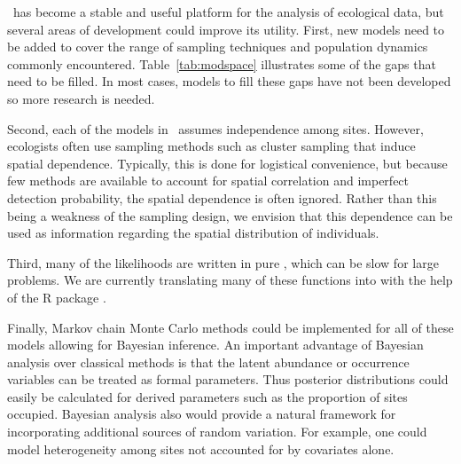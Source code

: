 \documentclass[article,shortnames]{jss}
\newcommand{\um}{\pkg{unmarked}}
\newcommand{\rlang}{\proglang{R}}
\begin{document}
{\um\ has become a stable and useful platform for the analysis of ecological
data, but several areas of development could improve its utility.  First, new
models need to be added to cover the range of sampling techniques and
population dynamics commonly encountered. Table~\ref{tab:modspace} illustrates
some of the gaps that need to be filled. In most cases, models to fill these
gaps have not been developed so more research is needed.


Second, each of the models in \um\ assumes independence among sites. However,
ecologists often use sampling methods such as cluster sampling that induce
spatial dependence. Typically, this is done for logistical convenience, but
because few methods are available to account for spatial correlation and
imperfect detection probability, the spatial dependence is often ignored.
Rather than this being a weakness of the sampling design, we envision that
this dependence can be used as information regarding the spatial distribution
of individuals.

Third, many of the likelihoods are written in pure \rlang, which can be
slow for large problems. We are currently translating many of these
functions into  with the help of the R package 
\citep{Rcpp11}.

Finally, Markov chain Monte Carlo methods could be implemented for all
of these models allowing for Bayesian inference.  An
important advantage of Bayesian analysis over classical methods is that the
latent abundance or occurrence variables can be treated as formal parameters.
Thus posterior distributions could easily be calculated for derived parameters
such as the proportion of sites occupied.  Bayesian analysis also would provide
a natural framework for incorporating additional sources of random variation.
For example, one could model heterogeneity among sites not accounted for by
covariates alone.

}
\end{document}
